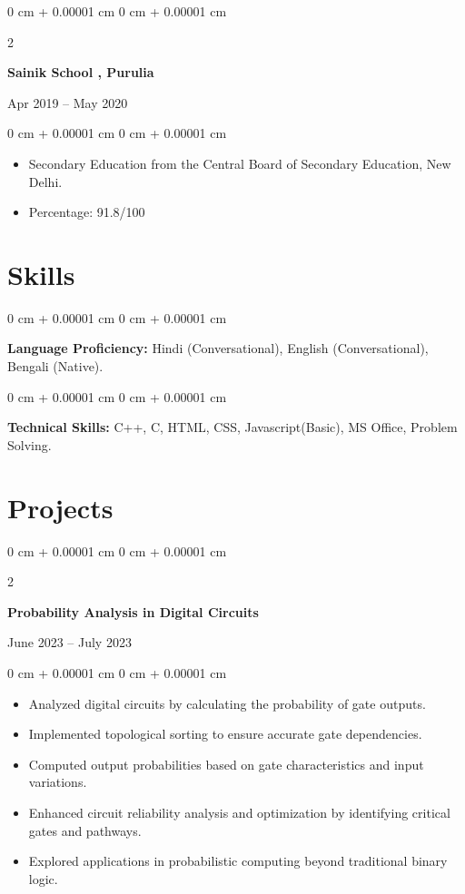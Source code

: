 \documentclass[10pt, letterpaper]{article}
\newenvironment{highlights}{
    \begin{itemize}[
        topsep=0.10 cm,
        parsep=0.10 cm,
        partopsep=0pt,
        itemsep=0pt,
        leftmargin=0 cm + 10pt
    ]
}{
    \end{itemize}
} %
\newenvironment{onecolentry}{
    \begin{adjustwidth}{
        0 cm + 0.00001 cm
    }{
        0 cm + 0.00001 cm
    }
}{
    \end{adjustwidth}
} %
\newenvironment{twocolentry}[2][]{
    \onecolentry
    \def\secondColumn{#2}
    \setcolumnwidth{\fill, 4.5 cm}
    \begin{paracol}{2}
}{
    \switchcolumn \raggedleft \secondColumn
    \end{paracol}
    \endonecolentry
} %
\begin{document}
\begin{twocolentry}{Apr 2019 – May 2020}
    \textbf{Sainik School , Purulia}
\end{twocolentry}

\vspace{0.10 cm}
\begin{onecolentry}
    \begin{highlights}
        \item Secondary Education from the Central Board of Secondary Education, New Delhi.
        \item Percentage: 91.8/100
    \end{highlights}
\end{onecolentry}

\vspace{-0.10 cm}



\section{Skills}

\begin{onecolentry}
    \textbf{Language Proficiency:} Hindi (Conversational), English (Conversational), Bengali (Native).
\end{onecolentry}


\begin{onecolentry}
    \textbf{Technical Skills:}  C++, C, HTML, CSS, Javascript(Basic), MS Office, Problem Solving.
\end{onecolentry}

\vspace{-0.10 cm}

\section{Projects}

\begin{twocolentry}{June 2023 – July 2023}
    \textbf{Probability Analysis in Digital Circuits}
\end{twocolentry}

\vspace{0.10 cm}
\begin{onecolentry}
    \begin{highlights}
        \item Analyzed digital circuits by calculating the probability of gate outputs.
        \item Implemented topological sorting to ensure accurate gate dependencies.
        \item Computed output probabilities based on gate characteristics and input variations.
        \item Enhanced circuit reliability analysis and optimization by identifying critical gates and pathways.
        \item Explored applications in probabilistic computing beyond traditional binary logic.
    \end{highlights}
\end{onecolentry}
\end{document}
